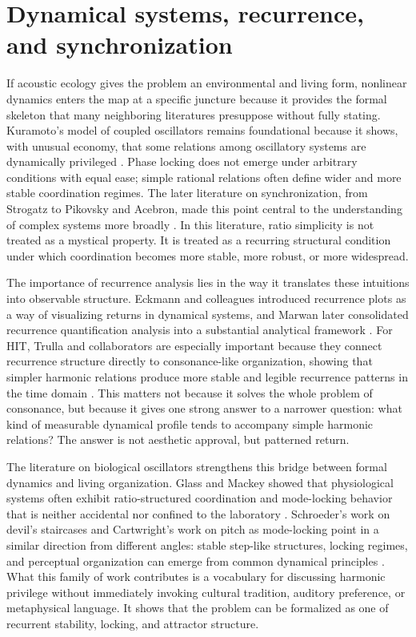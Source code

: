 \section{Dynamical systems, recurrence, and synchronization}

If acoustic ecology gives the problem an environmental and living form, nonlinear dynamics enters the map at a specific juncture because it provides the formal skeleton that many neighboring literatures presuppose without fully stating. Kuramoto's model of coupled oscillators remains foundational because it shows, with unusual economy, that some relations among oscillatory systems are dynamically privileged \parencite{kuramoto_1984}. Phase locking does not emerge under arbitrary conditions with equal ease; simple rational relations often define wider and more stable coordination regimes. The later literature on synchronization, from Strogatz to Pikovsky and Acebron, made this point central to the understanding of complex systems more broadly \parencite{strogatz_2000, pikovsky_2001, acebron_2005}. In this literature, ratio simplicity is not treated as a mystical property. It is treated as a recurring structural condition under which coordination becomes more stable, more robust, or more widespread.

The importance of recurrence analysis lies in the way it translates these intuitions into observable structure. Eckmann and colleagues introduced recurrence plots as a way of visualizing returns in dynamical systems, and Marwan later consolidated recurrence quantification analysis into a substantial analytical framework \parencite{eckmann_1987, marwan_2007}. For HIT, Trulla and collaborators are especially important because they connect recurrence structure directly to consonance-like organization, showing that simpler harmonic relations produce more stable and legible recurrence patterns in the time domain \parencite{trulla_2018}. This matters not because it solves the whole problem of consonance, but because it gives one strong answer to a narrower question: what kind of measurable dynamical profile tends to accompany simple harmonic relations? The answer is not aesthetic approval, but patterned return.

The literature on biological oscillators strengthens this bridge between formal dynamics and living organization. Glass and Mackey showed that physiological systems often exhibit ratio-structured coordination and mode-locking behavior that is neither accidental nor confined to the laboratory \parencite{glass_1988}. Schroeder's work on devil's staircases and Cartwright's work on pitch as mode-locking point in a similar direction from different angles: stable step-like structures, locking regimes, and perceptual organization can emerge from common dynamical principles \parencite{schroeder_1991, cartwright_2001}. What this family of work contributes is a vocabulary for discussing harmonic privilege without immediately invoking cultural tradition, auditory preference, or metaphysical language. It shows that the problem can be formalized as one of recurrent stability, locking, and attractor structure.

